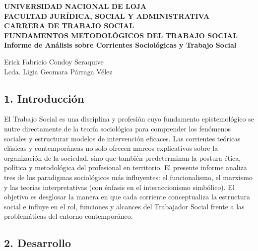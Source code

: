 \documentclass[12pt,spanish]{article}
\begin{document}
\begin{center}
    {\bfseries \Large UNIVERSIDAD NACIONAL DE LOJA}\\[0.3cm]
    {\bfseries \large FACULTAD JURÍDICA, SOCIAL Y
ADMINISTRATIVA}\\[0.2cm]
    {\bfseries CARRERA DE TRABAJO SOCIAL}\\[1.5cm]
    
    {\bfseries \large FUNDAMENTOS METODOLÓGICOS DEL TRABAJO
SOCIAL}\\[1cm]
    
    {\bfseries \Large Informe de Análisis sobre Corrientes Sociológicas
y Trabajo Social}\\[1.5cm]
\end{center}

\begin{center}
                        Erick Fabricio Condoy Seraquive \\
                \vspace{0.5cm}
    Lcda. Ligia Geomara Párraga Vélez \\ 
    
\end{center}

\vspace{1cm}

\doublespacing
\setlength{\parindent}{1.27cm}

\subsection{1. Introducción}\label{introducciuxf3n}

El Trabajo Social es una disciplina y profesión cuyo fundamento
epistemológico se nutre directamente de la teoría sociológica para
comprender los fenómenos sociales y estructurar modelos de intervención
eficaces. Las corrientes teóricas clásicas y contemporáneas no solo
ofrecen marcos explicativos sobre la organización de la sociedad, sino
que también predeterminan la postura ética, política y metodológica del
profesional en territorio. El presente informe analiza tres de los
paradigmas sociológicos más influyentes: el funcionalismo, el marxismo y
las teorías interpretativas (con énfasis en el interaccionismo
simbólico). El objetivo es desglosar la manera en que cada corriente
conceptualiza la estructura social e influye en el rol, funciones y
alcances del Trabajador Social frente a las problemáticas del entorno
contemporáneo.

\subsection{2. Desarrollo}\label{desarrollo}
\end{document}
